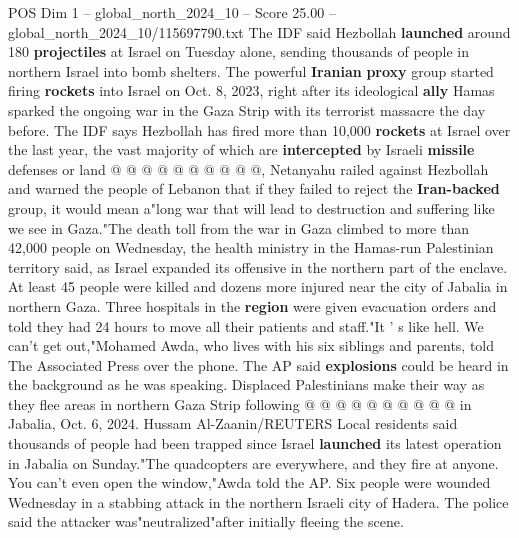 \begin{textsample}{POS Dim 1 – global\_north\_2024\_10 – Score 25.00 – global\_north\_2024\_10/115697790.txt}
The IDF said Hezbollah \textbf{launched} around 180 \textbf{projectiles} at Israel on Tuesday alone, sending thousands of people in northern Israel into bomb shelters.
The powerful \textbf{Iranian} \textbf{proxy} group started firing \textbf{rockets} into Israel on Oct. 8, 2023, right after its ideological \textbf{ally} Hamas sparked the ongoing war in the Gaza Strip with its terrorist massacre the day before.
The IDF says Hezbollah has fired more than 10,000 \textbf{rockets} at Israel over the last year, the vast majority of which are \textbf{intercepted} by Israeli \textbf{missile} defenses or land @ @ @ @ @ @ @ @ @ @, Netanyahu railed against Hezbollah and warned the people of Lebanon that if they failed to reject the \textbf{Iran-backed} group, it would mean a"long war that will lead to destruction and suffering like we see in Gaza."The death toll from the war in Gaza climbed to more than 42,000 people on Wednesday, the health ministry in the Hamas-run Palestinian territory said, as Israel expanded its offensive in the northern part of the enclave.
At least 45 people were killed and dozens more injured near the city of Jabalia in northern Gaza.
Three hospitals in the \textbf{region} were given evacuation orders and told they had 24 hours to move all their patients and staff."It ' s like hell.
We can't get out,"Mohamed Awda, who lives with his six siblings and parents, told The Associated Press over the phone.
The AP said \textbf{explosions} could be heard in the background as he was speaking.
Displaced Palestinians make their way as they flee areas in northern Gaza Strip following @ @ @ @ @ @ @ @ @ @ in Jabalia, Oct. 6, 2024.
Hussam Al-Zaanin/REUTERS Local residents said thousands of people had been trapped since Israel \textbf{launched} its latest operation in Jabalia on Sunday."The quadcopters are everywhere, and they fire at anyone.
You can't even open the window,"Awda told the AP.
Six people were wounded Wednesday in a stabbing attack in the northern Israeli city of Hadera.
The police said the attacker was"neutralized"after initially fleeing the scene.

\end{textsample}
